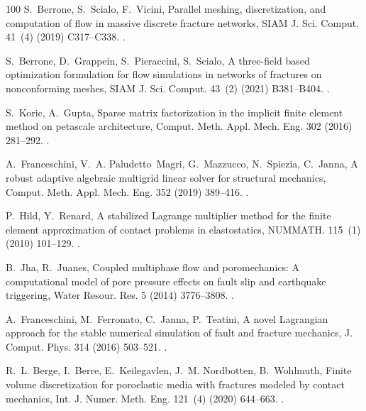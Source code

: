 \documentclass[3p,times]{elsarticle}
\theoremstyle{plain}
\begin{document}
\begin{thebibliography}{100}
S.~Berrone, S.~Scialo, F.~Vicini, Parallel meshing, discretization, and
  computation of flow in massive discrete fracture networks, SIAM J. Sci.
  Comput. 41~(4) (2019) C317--C338.
\newblock \href {https://doi.org/10.1137/18M1228736}
  {}.

S.~Berrone, D.~Grappein, S.~Pieraccini, S.~Scialo, A three-field based
  optimization formulation for flow simulations in networks of fractures on
  nonconforming meshes, SIAM J. Sci. Comput. 43~(2) (2021) B381--B404.
\newblock \href {https://doi.org/10.1137/20M1319188}
  {}.

S.~Koric, A.~Gupta, {Sparse matrix factorization in the implicit finite element
  method on petascale architecture}, Comput. Meth. Appl. Mech. Eng. 302 (2016)
  281--292.
\newblock \href {https://doi.org/10.1016/j.cma.2016.01.011}
  {}.

A.~Franceschini, V.~A. Paludetto~Magri, G.~Mazzucco, N.~Spiezia, C.~Janna, {A
  robust adaptive algebraic multigrid linear solver for structural mechanics},
  Comput. Meth. Appl. Mech. Eng. 352 (2019) 389--416.
\newblock \href {https://doi.org/10.1016/j.cma.2019.04.034}
  {}.

P.~Hild, Y.~Renard, {A stabilized Lagrange multiplier method for the finite
  element approximation of contact problems in elastostatics}, NUMMATH. 115~(1)
  (2010) 101--129.
\newblock \href {https://doi.org/10.1007/s00211-009-0273-z}
  {}.

B.~Jha, R.~Juanes, {Coupled multiphase flow and poromechanics: A computational
  model of pore pressure effects on fault slip and earthquake triggering},
  Water Resour. Res. 5 (2014) 3776--3808.
\newblock \href {https://doi.org/10.1002/2013WR015175}
  {}.

A.~Franceschini, M.~Ferronato, C.~Janna, P.~Teatini, {A novel Lagrangian
  approach for the stable numerical simulation of fault and fracture
  mechanics}, J. Comput. Phys. 314 (2016) 503--521.
\newblock \href {https://doi.org/10.1016/j.jcp.2016.03.032}
  {}.

R.~L. Berge, I.~Berre, E.~Keilegavlen, J.~M. Nordbotten, B.~Wohlmuth, {Finite
  volume discretization for poroelastic media with fractures modeled by contact
  mechanics}, Int. J. Numer. Meth. Eng. 121~(4) (2020) 644--663.
\newblock \href {https://doi.org/10.1002/nme.6238}
  {}.


\end{thebibliography}
\end{document}

